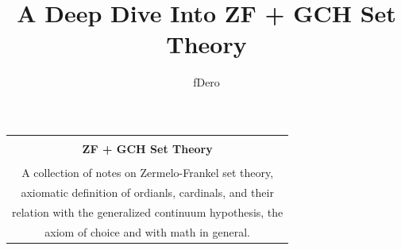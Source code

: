 \title{A Deep Dive Into ZF + GCH Set Theory}
\author{fDero}

\begin{titlepage}
    \begin{center}
        \begin{tabular}{c}
            {}                                                      \\ [40pt]
            {\Huge \bf ZF + GCH Set Theory}                         \\ [10pt]
            \hline                                                  \\ [20pt]  
            A collection of notes on Zermelo-Frankel set theory,    \\
            axiomatic definition of ordianls, cardinals, and their  \\
            relation with the generalized continuum hypothesis, the \\
            axiom of choice and with math in general.               \\
        \end{tabular}
    \end{center}
\end{titlepage}
\newpage